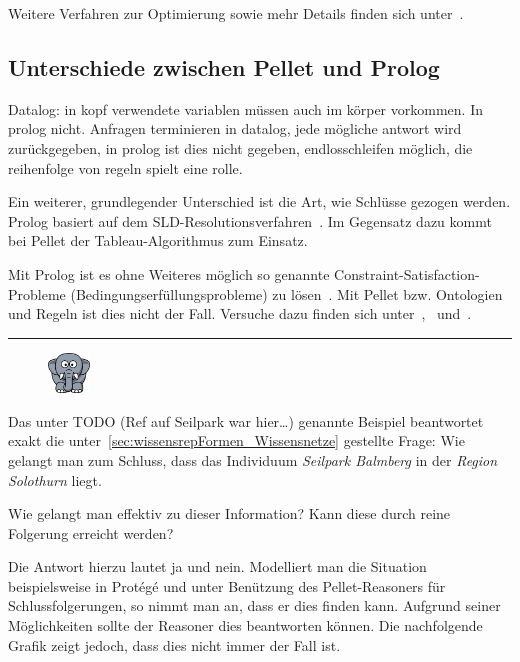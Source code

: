 Weitere Verfahren zur Optimierung sowie mehr Details finden sich unter~\cite[S. 17 bis 19]{sirin:pellet05}.


\subsection{Unterschiede zwischen Pellet und Prolog}
\label{subsec:inferenz_pellet_prolog}
Datalog: in kopf verwendete variablen müssen auch im körper vorkommen. In prolog nicht. Anfragen terminieren in datalog, jede mögliche antwort wird zurückgegeben, in prolog ist dies nicht gegeben, endlosschleifen möglich, die reihenfolge von regeln spielt eine rolle.~\cite[Seite 175]{laemmel}

Ein weiterer, grundlegender Unterschied ist die Art, wie Schlüsse gezogen werden. Prolog basiert auf dem SLD-Resolutionsverfahren~\citep[Details siehe][Seite 68]{laemmel}. Im Gegensatz dazu kommt bei Pellet der Tableau-Algorithmus zum Einsatz.

Mit Prolog ist es ohne Weiteres möglich so genannte Constraint-Satisfaction-Probleme (Bedingungserfüllungsprobleme) zu lösen~\citep[Details siehe][Seite 148]{laemmel}. Mit Pellet bzw. Ontologien und Regeln ist dies nicht der Fall. Versuche dazu finden sich unter~\citet{xiong2008constraint},~\citet{staab2006constraint} und~\citet{bramer2007constraint}.

\noindent\rule[1ex]{\textwidth}{1pt}
\begin{figure}
    \vspace{-12pt}
    \includegraphics[width=0.1\textwidth]{bilder/elephant.png}
\end{figure}
Das unter TODO (Ref auf Seilpark war hier\ldots) genannte Beispiel beantwortet exakt die unter~\ref{sec:wissensrepFormen_Wissensnetze} gestellte Frage: Wie gelangt man zum Schluss, dass das Individuum \textit{Seilpark Balmberg} in der \textit{Region} \textit{Solothurn} liegt.

Wie gelangt man effektiv zu dieser Information? Kann diese durch reine Folgerung erreicht werden?

Die Antwort hierzu lautet ja und nein. Modelliert man die Situation beispielsweise in Protégé und unter Benützung des Pellet-Reasoners für Schlussfolgerungen, so nimmt man an, dass er dies finden kann. Aufgrund seiner Möglichkeiten sollte der Reasoner dies beantworten können. Die nachfolgende Grafik zeigt jedoch, dass dies nicht immer der Fall ist.

